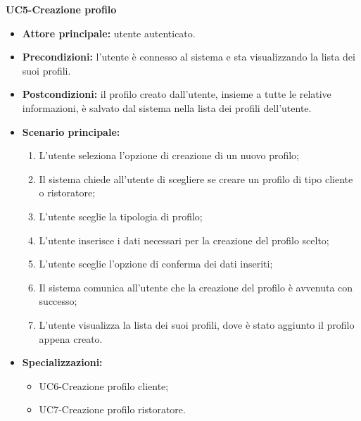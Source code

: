 \textbf{UC5-Creazione profilo}
\begin{itemize}
    \item \textbf{Attore principale:} utente autenticato.
    \item \textbf{Precondizioni:} l'utente è connesso al sistema e sta visualizzando la lista dei suoi profili.
    \item \textbf{Postcondizioni:} il profilo creato dall'utente, insieme a tutte le relative informazioni,
    è salvato dal sistema nella lista dei profili dell'utente.
    \item \textbf{Scenario principale:}
    \begin{enumerate}
        \item L'utente seleziona l'opzione di creazione di un nuovo profilo;
        \item Il sistema chiede all'utente di scegliere se creare un profilo di tipo cliente
        o ristoratore;
        \item L'utente sceglie la tipologia di profilo;
        \item L'utente inserisce i dati necessari per la creazione del profilo scelto;
        \item L'utente sceglie l'opzione di conferma dei dati inseriti;
        \item Il sistema comunica all'utente che la creazione del profilo è avvenuta con successo;
        \item L'utente visualizza la lista dei suoi profili, dove è stato aggiunto il profilo appena creato.
    \end{enumerate}
    \item \textbf{Specializzazioni:}
        \begin{itemize}
            \item UC6-Creazione profilo cliente;
            \item UC7-Creazione profilo ristoratore.
        \end{itemize}
\end{itemize}

